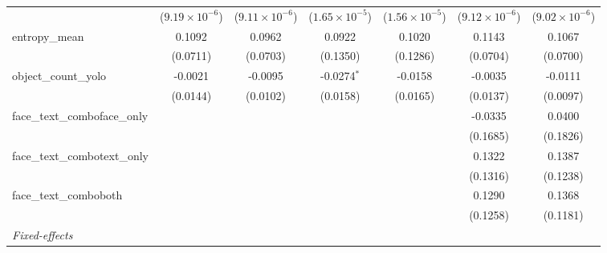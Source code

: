 \begin{table}[htbp]
\begin{tabular}{lcccccc}
                                     & ($9.19\times 10^{-6}$)  & ($9.11\times 10^{-6}$)  & ($1.65\times 10^{-5}$)       & ($1.56\times 10^{-5}$)      & ($9.12\times 10^{-6}$)  & ($9.02\times 10^{-6}$)\\    
      entropy\_mean                  & 0.1092                  & 0.0962                  & 0.0922                       & 0.1020                      & 0.1143                  & 0.1067\\   
                                     & (0.0711)                & (0.0703)                & (0.1350)                     & (0.1286)                    & (0.0704)                & (0.0700)\\   
      object\_count\_yolo            & -0.0021                 & -0.0095                 & -0.0274$^{*}$                & -0.0158                     & -0.0035                 & -0.0111\\   
                                     & (0.0144)                & (0.0102)                & (0.0158)                     & (0.0165)                    & (0.0137)                & (0.0097)\\   
      face\_text\_comboface\_only    &                         &                         &                              &                             & -0.0335                 & 0.0400\\   
                                     &                         &                         &                              &                             & (0.1685)                & (0.1826)\\   
      face\_text\_combotext\_only    &                         &                         &                              &                             & 0.1322                  & 0.1387\\   
                                     &                         &                         &                              &                             & (0.1316)                & (0.1238)\\   
      face\_text\_comboboth          &                         &                         &                              &                             & 0.1290                  & 0.1368\\   
                                     &                         &                         &                              &                             & (0.1258)                & (0.1181)\\   
      \midrule
      \emph{Fixed-effects}\\

\end{tabular}
\end{table}
